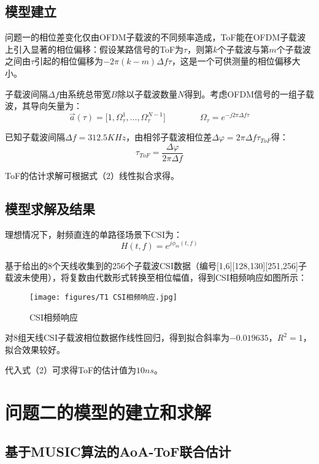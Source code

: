\documentclass[withoutpreface,bwprint]{cumcmthesis}
\begin{document}
\subsection{模型建立}
问题一的相位差变化仅由OFDM子载波的不同频率造成，ToF能在OFDM子载波上引入显著的相位偏移：假设某路信号的ToF为$\tau$，则第$k$个子载波与第$m$个子载波之间由$\tau$引起的相位偏移为$-2\pi(k-m)\Delta f\tau$，这是一个可供测量的相位偏移大小。

子载波间隔$\Delta f$由系统总带宽$B$除以子载波数量$N$得到。考虑OFDM信号的一组子载波，其导向矢量为：
\begin{equation}
    \overrightarrow{a}(\tau)=\lbrack1,\Omega_{\tau}^{1},\dots,\Omega_{\tau}^{N-1}\rbrack \qquad \qquad \Omega_{\tau}=e^{-j2\pi \Delta f \tau}
\end{equation}

已知子载波间隔$\Delta f=312.5KHz$，由相邻子载波相位差$\Delta\varphi=2\pi\Delta f\tau_{ToF}$得：
\begin{equation}
    \tau_{ToF}=\frac{\Delta\varphi}{2\pi\Delta f}
\end{equation}

ToF的估计求解可根据式（2）线性拟合求得。

\subsection{模型求解及结果}
理想情况下，射频直连的单路径场景下CSI为：
\begin{equation}
    H(t,f)=e^{j\phi_{m}(t,f)}
\end{equation}

基于给出的8个天线收集到的256个子载波CSI数据（编号[1,6][128,130][251,256]子载波未使用），将复数由代数形式转换至相位幅值，得到CSI相频响应如图所示：

\begin{figure}[h]
\caption{CSI相频响应} \label{fig:aa}
\centering
\texttt{[image: figures/T1 CSI相频响应.jpg]}
\end{figure}

对8组天线CSI子载波相位数据作线性回归，得到拟合斜率为$-0.019635$，$R^2=1$，拟合效果较好。

代入式（2）可求得ToF的估计值为$10ns$。
\section{问题二的模型的建立和求解}
\subsection{基于MUSIC算法的AoA-ToF联合估计}
\end{document}
